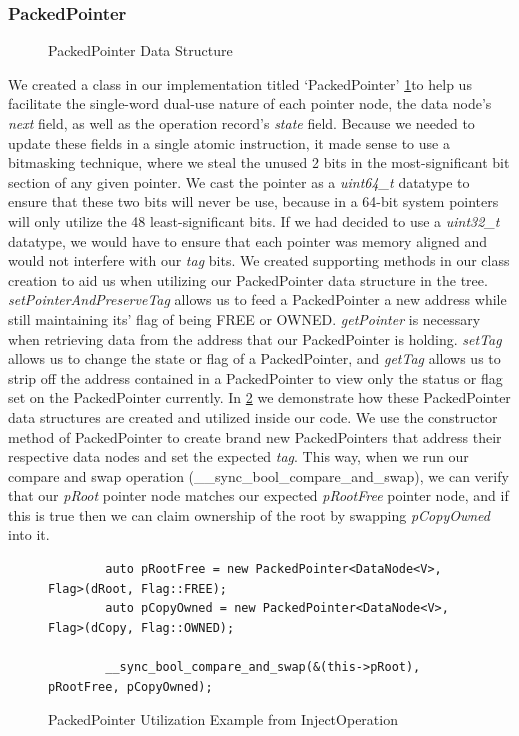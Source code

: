 \documentclass[letterpaper, 10 pt, conference]{ieeeconf}
\begin{document}
	\subsubsection{PackedPointer}
	\begin{figure}
		
		\caption{PackedPointer Data Structure}
		\label{packedpointer}
	\end{figure}
	
	We created a class in our implementation titled `PackedPointer' \ref{packedpointer}to help us facilitate the single-word dual-use nature of each pointer node, the data node's \textit{next} field, as well as the operation record's \textit{state} field. Because we needed to update these fields in a single atomic instruction, it made sense to use a bitmasking technique, where we steal the unused 2 bits in the most-significant bit section of any given pointer. We cast the pointer as a \textit{uint64\_t} datatype to ensure that these two bits will never be use, because in a 64-bit system pointers will only utilize the 48 least-significant bits. If we had decided to use a \textit{uint32\_t} datatype, we would have to ensure that each pointer was memory aligned and would not interfere with our \textit{tag} bits. We created supporting methods in our class creation to aid us when utilizing our PackedPointer data structure in the tree. \textit{setPointerAndPreserveTag} allows us to feed a PackedPointer a new address while still maintaining its' flag of being FREE or OWNED. \textit{getPointer} is necessary when retrieving data from the address that our PackedPointer is holding. \textit{setTag} allows us to change the state or flag of a PackedPointer, and \textit{getTag} allows us to strip off the address contained in a PackedPointer to view only the status or flag set on the PackedPointer currently. In \ref{packedpointerexample} we demonstrate how these PackedPointer data structures are created and utilized inside our code. We use the constructor method of PackedPointer to create brand new PackedPointers that address their respective data nodes and set the expected \textit{tag}. This way, when we run our compare and swap operation (\_\_sync\_bool\_compare\_and\_swap), we can verify that our \textit{pRoot} pointer node matches our expected \textit{pRootFree} pointer node, and if this is true then we can claim ownership of the root by swapping \textit{pCopyOwned} into it.
	
	\begin{figure}
		\begin{lstlisting}
		auto pRootFree = new PackedPointer<DataNode<V>, Flag>(dRoot, Flag::FREE);
		auto pCopyOwned = new PackedPointer<DataNode<V>, Flag>(dCopy, Flag::OWNED);
		
		__sync_bool_compare_and_swap(&(this->pRoot), pRootFree, pCopyOwned);
		\end{lstlisting}
		\caption{PackedPointer Utilization Example from InjectOperation}
		\label{packedpointerexample}
	\end{figure}
\end{document}
